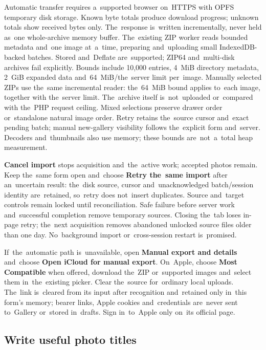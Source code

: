\documentclass[11pt,a4paper]{article}
\newcommand{\ui}[1]{\textbf{#1}}
\begin{document}
Automatic transfer requires a~supported browser on~HTTPS with OPFS temporary
disk storage. Known byte totals produce download progress; unknown totals show
received bytes only. The~response is~written incrementally, never held as~one
whole-archive memory buffer. The~existing ZIP worker reads bounded metadata
and~one image at~a~time, preparing and~uploading small IndexedDB-backed
batches. Stored and~Deflate are~supported; ZIP64 and~multi-disk archives fail
explicitly. Bounds include 10,000 entries, 4~MiB directory metadata, 2~GiB
expanded data and~64~MiB/the~server limit per~image. Manually selected ZIPs use
the~same incremental reader: the~64~MiB bound applies to~each image, together
with the~server limit. The~archive itself is~not~uploaded or~compared with
the~PHP request ceiling. Mixed selections preserve drawer order or~standalone
natural image order. Retry retains the~source cursor and~exact pending batch;
manual new-gallery visibility follows the~explicit form and~server. Decoders
and~thumbnails also use memory; these bounds are~not~a~total heap measurement.

\ui{Cancel import} stops acquisition and~the~active work; accepted photos
remain. Keep the~same form open and~choose \ui{Retry the~same import} after
an~uncertain result: the~disk source, cursor and~unacknowledged batch/session
identity are~retained, so~retry does not~insert duplicates. Source and~target
controls remain locked until reconciliation. Safe failure before server work
and~successful completion remove temporary sources. Closing the~tab loses
in-page retry; the~next acquisition removes abandoned unlocked source files
older than one day. No~background import or~cross-session restart is~promised.

If~the~automatic path is~unavailable, open \ui{Manual export and details}
and~choose \ui{Open iCloud for manual export}. On~Apple, choose \ui{Most
Compatible} when offered, download the~ZIP or~supported images and~select them
in~the~existing picker. Clear the~source for~ordinary local uploads. The~link
is~cleared from its input after recognition and~retained only in~this form's
memory; bearer links, Apple cookies and~credentials are~never sent to~Gallery
or~stored in~drafts. Sign in~to~Apple only on~its official page.

\subsection{Write useful photo titles}
\end{document}
